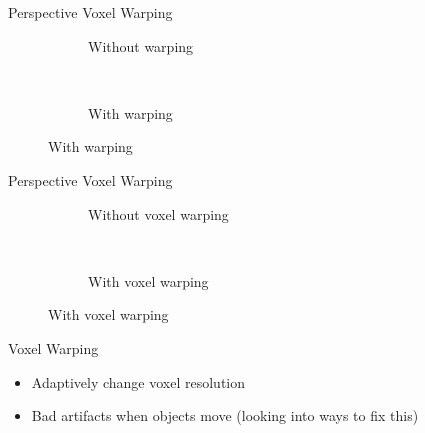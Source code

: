 \documentclass[10pt]{beamer}
\begin{document}
\begin{frame}{Perspective Voxel Warping}
  \begin{figure}
    \begin{subfigure}[t]{0.475\textwidth}
      \caption*{Without warping}
    \end{subfigure}
    ~
    \begin{subfigure}[t]{0.475\textwidth}
      \caption*{With warping}
    \end{subfigure}
  \end{figure}
\end{frame}

\begin{frame}{Perspective Voxel Warping}
  \begin{figure}
    \begin{subfigure}[t]{0.475\textwidth}
      \caption*{Without voxel warping}
    \end{subfigure}
    ~
    \begin{subfigure}[t]{0.475\textwidth}
      \caption*{With voxel warping}
    \end{subfigure}
  \end{figure}
\end{frame}

\begin{frame}{Voxel Warping}
  \begin{itemize}
    \item Adaptively change voxel resolution
    \item Bad artifacts when objects move (looking into ways to fix this) %
  \end{itemize}
\end{frame}
\end{document}
